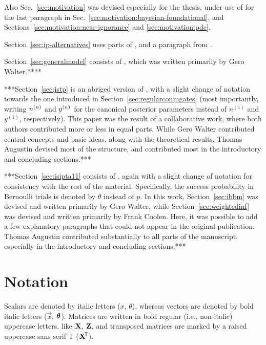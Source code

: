 Also Sec.~\ref{sec:motivation} was devised especially for the thesis,
under use of \textcite[\S 2.3]{itip-statinf} for the last paragraph in
Sec.~\ref{sec:motivation:bayesian-foundational},
and Sections~\ref{sec:motivation:near-ignorance} and \ref{sec:motivation:pdc}.

Section~\ref{sec:ip-alternatives} uses parts of \textcite[\S 2.2, 2.4]{itip-statinf},
and a paragraph from \textcite[\S 7]{itip-statinf}.

Section~\ref{sec:generalmodel} consists of \textcite[\S 4.3]{itip-statinf},
which was written primarily by Gero Walter.****

***Section~\ref{sec:jstp} is an abriged version of \textcite{Walter2009a},
with a slight change of notation towards the one introduced in Section~\ref{sec:regularconjugates}
(most importantly, writing $n^{(n)}$ and $y^{(n)}$ for the canonical posterior parameters
instead of $n^{(1)}$ and $y^{(1)}$, respectively).
This paper was the result of a collaborative work, where both authors contributed
more or less in equal parts. While Gero Walter contributed central concepts and basic ideas,
along with the theoretical results, Thomas Augustin devised most of the structure,
and contributed most in the introductory and concluding sections.***

***Section~\ref{sec:isipta11} consists of \textcite{Walter2011a},
again with a slight change of notation for consistency with the rest of the material.
Specifically, the success probability in Bernoulli trials is denoted by $\theta$ instead of $p$.
In this work, Section~\ref{sec:ibbm} was devised and written primarily by Gero Walter,
while Section~\ref{sec:weightedinf} was devised and written primarily by Frank Coolen.
Here, it was possible to add a few explanatory paragraphs that could not appear in the original publication. 
Thomas Augustin contributed substantially to all parts of the manuscript,
especially in the introductory and concluding sections.***

\section{Notation}
\label{sec:notation}

Scalars are denoted by italic letters ($x$, $\theta$),
whereas vectors are denoted by bold italic letters ($\vec{x}$, $\boldsymbol{\theta}$).
Matrices are written in bold regular (i.e., non-italic) uppercase letters, like $\mathbf{X}$, $\mathbf{Z}$,
and transposed matrices are marked by a raised uppercase sans serif T ($\mathbf{X}^{{\mbox{\!\scriptsize\textsf{T}}}}$).

